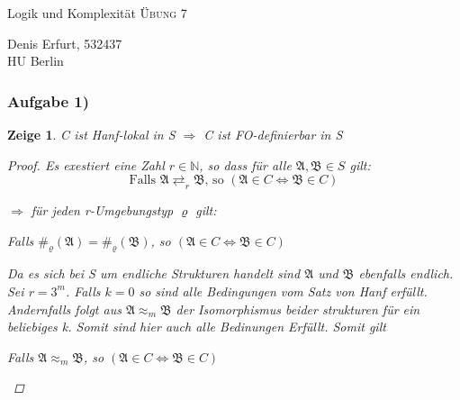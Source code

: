 \documentclass[12pt]{article}
\newtheorem{zeige}{Zeige}
\begin{document}
\begin{center}
\Large
Logik und Komplexität  \textsc{ Übung 7 }
\end{center}

\begin{flushright}
Denis Erfurt, 532437\\
HU Berlin \\

\vspace{2 mm}

\end{flushright}

\subsubsection*{Aufgabe 1)}
\begin{zeige}
  C ist Hanf-lokal in S $\Rightarrow $ C ist FO-definierbar in S
\begin{proof}
  
  Es exestiert eine Zahl $r\in\mathbb{N}$, so dass für alle $\mathfrak{A},\mathfrak{B}\in S$ gilt: 
  \[ \text{Falls } \mathfrak{A} \rightleftarrows_r \mathfrak{B} \text{, so } (\mathfrak{A}\in C \Leftrightarrow \mathfrak{B}\in C ) \] 

  $\Rightarrow $ für jeden r-Umgebungstyp $\varrho$ gilt:
  \begin{center}
    Falls $\#_\varrho(\mathfrak{A}) = \#_\varrho (\mathfrak{B})$, so $(\mathfrak{A}\in C \Leftrightarrow \mathfrak{B}\in C )$\\
  \end{center}
  

  
  
  Da es sich bei S um endliche Strukturen handelt sind $\mathfrak{A}$ und $\mathfrak{B}$ ebenfalls endlich. Sei $r=3^m$.
  Falls $k=0$ so sind alle Bedingungen vom Satz von Hanf erfüllt. Andernfalls folgt aus $\mathfrak{A} \approx_m \mathfrak{B}$ der Isomorphismus beider strukturen für ein beliebiges k. Somit sind hier auch alle Bedinungen Erfüllt. Somit gilt 
  \begin{center}
    Falls $\mathfrak{A} \approx_m \mathfrak{B}$, so $(\mathfrak{A}\in C \Leftrightarrow \mathfrak{B}\in C )$
  \end{center}
  

\end{proof}
\end{zeige}
\end{document}
